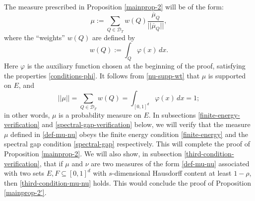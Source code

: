 \documentclass[a4paper,11pt]{amsart}
\numberwithin{equation}{section}
\begin{document}
The measure prescribed in Proposition \ref{mainprop-2} will be of the form: 
\begin{equation} \label{def-mu-nu}
\mu := \sum_{Q \in \mathscr{D}_T} w(Q) \frac{\overline{\mu}_Q}{||\overline{\mu}_Q||}, 
\end{equation} 
where the ``weights'' $w(Q)$ are defined by 
\begin{equation} \label{weights-def} w(Q) := \int_{Q} \varphi(x) \, dx. \end{equation}
Here $\varphi$ is the auxiliary function chosen at the beginning of the proof, satisfying the properties \eqref{conditions-phi}. 
It follows from \eqref{nu-supp-wt} that $\mu$ is supported on $E$, and 
\[ ||\mu|| = \sum_{Q \in \mathscr{D}_T} w(Q) = \int_{[0,1]^d} \varphi(x) \, dx = 1; \] 
in other words, $\mu$ is a probability measure on $E$. 
\vskip0.1in
\noindent In subsections \ref{finite-energy-verification} and \eqref{spectral-gap-verification} below, we will verify that the measure $\mu$ defined in \eqref{def-mu-nu} obeys the finite energy condition \eqref{finite-energy} and the spectral gap condition \eqref{spectral-gap} respectively. This will complete the proof of Proposition \ref{mainprop-2}. We will also show, in subsection \ref{third-condition-verification}, that if $\mu$ and $\nu$ are two measures of the form \eqref{def-mu-nu} associated with two sets $E, F \subseteq [0,1]^d$ with $s$-dimensional Hausdorff content at least $1 - \rho$, then \eqref{third-condition-mu-nu} holds. This would conclude the proof of Proposition \ref{mainprop-2'}.    
\end{document}
